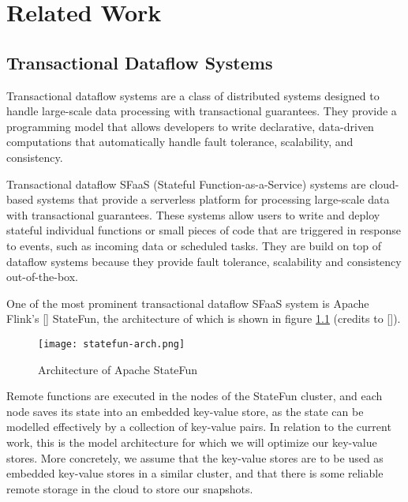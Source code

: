 
\chapter{Related Work}

\label{Chapter2-related-work}

\section{Transactional Dataflow Systems}

Transactional dataflow systems are a class of distributed systems designed to handle large-scale data processing with transactional guarantees.
They provide a programming model that allows developers to write declarative, data-driven computations that automatically handle fault tolerance, scalability, and consistency.

Transactional dataflow SFaaS (Stateful Function-as-a-Service) systems are cloud-based systems that provide a serverless platform for processing large-scale data with transactional guarantees.
These systems allow users to write and deploy stateful individual functions or small pieces of code that are triggered in response to events, such as incoming data or scheduled tasks. They are build on top of dataflow systems because they provide fault tolerance, scalability and consistency out-of-the-box.

One of the most prominent transactional dataflow SFaaS system is Apache Flink's [\cite{apache-flink}] StateFun, the architecture of which is shown in figure \ref{fig:statefun-arch} (credits to [\cite{transactions-serverless-functions-leveraging-stateful-dataflows}]).

\begin{figure}[h]
    \centering
    \texttt{[image: statefun-arch.png]}
    \caption{Architecture of Apache StateFun}
    \label{fig:statefun-arch}
\end{figure}

Remote functions are executed in the nodes of the StateFun cluster, and each node saves its state into an embedded key-value store, as the state can be modelled effectively by a collection of key-value pairs.
In relation to the current work, this is the model architecture for which we will optimize our key-value stores. More concretely, we assume that the key-value stores are to be used as embedded key-value stores in a similar cluster, and that there is some reliable remote storage in the cloud to store our snapshots.

